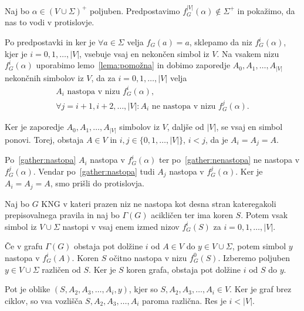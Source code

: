 \documentclass[fin1, tisk]{fmfdelo}
\providecommand{\abs}[1]{\left\lvert #1 \right\rvert}
\theoremstyle{definition}
\begin{document}
\begin{dokaz}
    Naj bo $\alpha \in ( V \cup \Sigma)^+$ poljuben. Predpostavimo 
    $f^{\abs{V} }_G(\alpha) \notin \Sigma^+$ in pokažimo, da nas to vodi v
    protislovje.

    Po predpostavki in ker je $\forall a \in \Sigma$ velja $f_G(a) = a$, sklepamo da niz 
    $f^i_G(\alpha)$, kjer je $i= 0, 1, \ldots, \abs{V}$, vsebuje vsaj en nekončen simbol iz $V$. 
    Na vsakem nizu $f^i_G(\alpha)$ uporabimo lemo~\ref{lema:pomožna} in dobimo zaporedje 
    $A_0, A_1, \ldots, A_{\abs{V}}$ nekončnih simbolov iz $V$, da za $i= 0, 1, \ldots, \abs{V}$ 
    velja
    \begin{gather}
            A_i \text{ nastopa v nizu } f^i_G(\alpha), \label{gather:nastopa} \\
            \forall j = i+1, i+2, \ldots, \abs{V} \colon A_i \text{ 
            ne nastopa v nizu } f^j_G(\alpha). \label{gather:nenastopa}
    \end{gather}
    
    Ker je zaporedje $A_0, A_1, \ldots, A_{\abs{V}}$ simbolov iz $V$, daljše od $\abs{V}$, se vsaj
    en simbol ponovi. Torej, obstaja $A \in V$ in $i,j \in \{0, 1, \ldots, \abs{V} \}$, $i<j$, 
    da je $A_i = A_j = A$.

    Po~\eqref{gather:nastopa} $A_i$ nastopa v $f^i_G(\alpha)$ ter po~\eqref{gather:nenastopa} ne 
    nastopa v $f^j_G(\alpha)$. Vendar po~\eqref{gather:nastopa} tudi $A_j$ nastopa v $f^j_G(\alpha)$.
    Ker je $A_i = A_j = A$, smo prišli do protislovja.
\end{dokaz}

\begin{lema}\label{lema:nastopanje}
    Naj bo $G$ KNG v kateri prazen niz ne nastopa kot desna stran 
    kateregakoli prepisovalnega pravila in naj bo $\Gamma(G)$ acikličen ter ima
    koren $S$. Potem vsak simbol iz $V \cup \Sigma$ nastopi v vsaj enem izmed nizov $f^i_G(S)$ za 
    $i= 0, 1, \ldots, \abs{V}$. 
\end{lema}

\begin{dokaz}
    Če v grafu $\Gamma(G)$ obstaja pot dolžine $i$ od $A \in V$ do $y \in V \cup \Sigma$, potem
    simbol $y$ nastopa v $f^i_G(A)$. Koren $S$ očitno nastopa v nizu $f^0_G(S)$. Izberemo poljuben
    $y \in V \cup \Sigma$ različen od $S$. Ker je $S$ koren grafa, obstaja pot dolžine 
    $i$ od $S$ do $y$. 
     
    Pot je oblike $(S, A_2, A_3, \ldots, A_i, y)$, kjer so $S, A_2, A_3, \ldots, A_i \in V$. Ker 
    je graf brez ciklov, so vsa vozlišča $S, A_2, A_3, \ldots, A_i$ paroma različna. Res je 
    $i < \abs{V}$.
\end{dokaz}
\end{document}
